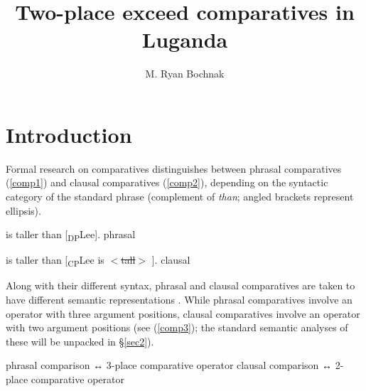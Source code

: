 \documentclass[output=paper,
modfonts
]{langscibook}
\title{Two-place {exceed} comparatives in Luganda}
\author{M. Ryan Bochnak\affiliation{University of Konstanz} }
\begin{document}
\maketitle
\section{Introduction}\label{sec:bochnak:1}



 Formal research on comparatives distinguishes between {\sc phrasal comparatives} (\ref{comp1}) and {\sc clausal comparatives} (\ref{comp2}), depending on the syntactic category of the standard phrase (complement of {\it than}; angled brackets represent ellipsis).


\begin{exe}

\ex\label{comp1} 
 is taller than [\textsubscript{DP}Lee]. \hfill {\sc phrasal}

\vspace*{-1mm}
\ex\label{comp2} 
 is taller than [\textsubscript{CP}Lee is $<$\sout{tall}$>$ ]. \hfill {\sc clausal}

\end{exe}


Along with their different syntax, phrasal and clausal comparatives are taken to have different semantic representations \citep[among others]{bhatt11reduced, heim85notes, kennedy97projecting}. While phrasal comparatives involve an operator with three argument positions, clausal comparatives involve an operator with two argument positions (see (\ref{comp3}); the standard semantic analyses of these will be unpacked in \S \ref{sec2}).



\begin{exe}
\ex\label{comp3}
\begin{xlist}
\ex phrasal comparison ↔ 3-place comparative operator
\ex clausal comparison ↔ 2-place comparative operator
\end{xlist}
\end{exe}
\end{document}
